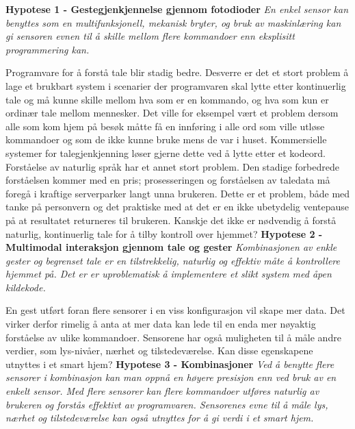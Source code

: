\textbf{Hypotese 1 - Gestegjenkjennelse gjennom fotodioder}\newline
\emph{En enkel sensor kan benyttes som en multifunksjonell, mekanisk bryter, og bruk av maskinlæring kan gi sensoren evnen til å skille mellom flere kommandoer enn eksplisitt programmering kan.}\newline

Programvare for å forstå tale blir stadig bedre. Desverre er det et stort problem å lage et brukbart system i scenarier der programvaren skal lytte etter kontinuerlig tale og må kunne skille mellom hva som er en kommando, og hva som kun er ordinær tale mellom mennesker. Det ville for eksempel vært et problem dersom alle som kom hjem på besøk måtte få en innføring i alle ord som ville utløse kommandoer og som de ikke kunne bruke mens de var i huset. Kommersielle systemer for talegjenkjenning løser gjerne dette ved å lytte etter et kodeord. Forståelse av naturlig språk har et annet stort problem. Den stadige forbedrede forståelsen kommer med en pris; prosesseringen og forståelsen av taledata må foregå i kraftige serverparker langt unna brukeren. Dette er et problem, både med tanke på personvern og det praktiske med at det er en ikke ubetydelig ventepause på at resultatet returneres til brukeren. Kanskje det ikke er nødvendig å forstå naturlig, kontinuerlig tale for å tilby kontroll over hjemmet? \newline\newline
\textbf{Hypotese 2 - Multimodal interaksjon gjennom tale og gester}\newline
\emph{Kombinasjonen av enkle gester og begrenset tale er en tilstrekkelig, naturlig og effektiv måte å kontrollere hjemmet på. Det er er uproblematisk å implementere et slikt system med åpen kildekode.}\newline

En gest utført foran flere sensorer i en viss konfigurasjon vil skape mer data. Det virker derfor rimelig å anta at mer data kan lede til en enda mer nøyaktig forståelse av ulike kommandoer. Sensorene har også muligheten til å måle andre verdier, som lys-nivåer, nærhet og tilstedeværelse. Kan disse egenskapene utnyttes i et smart hjem?\newline\newline
\textbf{Hypotese 3 - Kombinasjoner}\newline
\emph{Ved å benytte flere sensorer i kombinasjon kan man oppnå en høyere presisjon enn ved bruk av en enkelt sensor. Med flere sensorer kan flere kommandoer utføres naturlig av brukeren og forstås effektivt av programvaren. Sensorenes evne til å måle lys, nærhet og tilstedeværelse kan også utnyttes for å gi verdi i et smart hjem.}\newline

